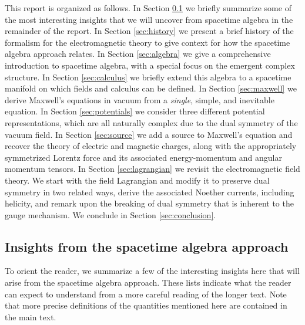 \documentclass[1p,sort&compress]{elsarticle}
\numberwithin{equation}{section}
\begin{document}
This report is organized as follows.  In Section \ref{sec:insights} we briefly summarize some of the most interesting insights that we will uncover from spacetime algebra in the remainder of the report.  In Section \ref{sec:history} we present a brief history of the formalism for the electromagnetic theory to give context for how the spacetime algebra approach relates.  In Section \ref{sec:algebra} we give a comprehensive introduction to spacetime algebra, with a special focus on the emergent complex structure.  In Section \ref{sec:calculus} we briefly extend this algebra to a spacetime manifold on which fields and calculus can be defined.  In Section \ref{sec:maxwell} we derive Maxwell's equations in vacuum from a \emph{single}, simple, and inevitable equation.  In Section \ref{sec:potentials} we consider three different potential representations, which are all naturally complex due to the dual symmetry of the vacuum field.  In Section \ref{sec:source} we add a source to Maxwell's equation and recover the theory of electric and magnetic charges, along with the appropriately symmetrized Lorentz force and its associated energy-momentum and angular momentum tensors.  In Section \ref{sec:lagrangian} we revisit the electromagnetic field theory. We start with the field Lagrangian and modify it to preserve dual symmetry in two related ways, derive the associated Noether currents, including helicity, and remark upon the breaking of dual symmetry that is inherent to the gauge mechanism.  We conclude in Section \ref{sec:conclusion}.


\subsection{Insights from the spacetime algebra approach}\label{sec:insights}


To orient the reader, we summarize a few of the interesting insights here that will arise from the spacetime algebra approach.  These lists indicate what the reader can expect to understand from a more careful reading of the longer text.  Note that more precise definitions of the quantities mentioned here are contained in the main text.

\vspace{3mm}
\end{document}
